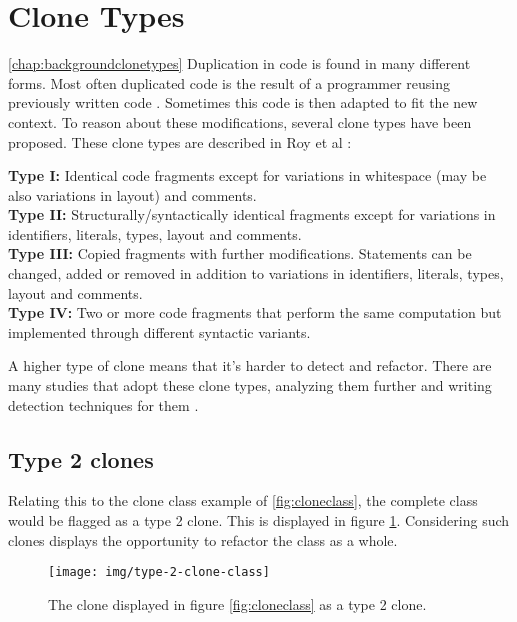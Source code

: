\section{Clone Types} \ref{chap:backgroundclonetypes}
Duplication in code is found in many different forms. Most often duplicated code is the result of a programmer reusing previously written code \cite{haefliger2008code, baxter1998clone}. Sometimes this code is then adapted to fit the new context. To reason about these modifications, several clone types have been proposed. These clone types are described in Roy et al \cite{roy2007survey}:
\begin{displayquote}
\textbf{Type I:} Identical code fragments except for variations in whitespace (may be also variations in layout) and comments.\\
\textbf{Type II:} Structurally/syntactically identical fragments except for variations in identifiers, literals, types, layout and comments.\\
\textbf{Type III:} Copied fragments with further modifications. Statements can be changed, added or removed in addition to variations in identifiers, literals, types, layout and comments.\\
\textbf{Type IV:} Two or more code fragments that perform the same computation but implemented through different syntactic variants.
\end{displayquote}
A higher type of clone means that it's harder to detect and refactor. There are many studies that adopt these clone types, analyzing them further and writing detection techniques for them \cite{sajnani2016sourcerercc, kodhai2010detection, van2019novel}.

\subsection{Type 2 clones}
Relating this to the clone class example of \ref{fig:cloneclass}, the complete class would be flagged as a type 2 clone. This is displayed in figure \ref{fig:type2cloneclass}. Considering such clones displays the opportunity to refactor the class as a whole.

\begin{figure}[H]
	\texttt{[image: img/type-2-clone-class]}
	\caption{The clone displayed in figure \ref{fig:cloneclass} as a type 2 clone.}
	\label{fig:type2cloneclass}
\end{figure}

